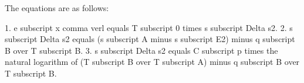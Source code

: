 The equations are as follows:

1. e subscript x comma verl equals T subscript 0 times s subscript Delta s2.
2. s subscript Delta s2 equals (s subscript A minus s subscript E2) minus q subscript B over T subscript B.
3. s subscript Delta s2 equals C subscript p times the natural logarithm of (T subscript B over T subscript A) minus q subscript B over T subscript B.